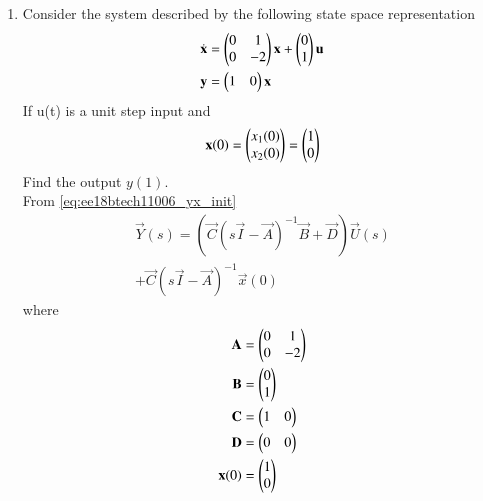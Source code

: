 \begin{enumerate}[label=\thesubsection.\arabic*.,ref=\thesubsection.\theenumi]

\item
Consider the system described by the following state space representation  
\begin{align}
\dot{\mathbf{ x}}&=\begin{pmatrix}0&1\\0&-2\end{pmatrix}\mathbf{x} + \begin{pmatrix}0\\1\end{pmatrix}\mathbf{u}\\  
\mathbf{y} &= \begin{pmatrix}1&0\end{pmatrix}\mathbf{x}
\end{align}
If u(t) is a unit step input and 
\begin{align}
\mathbf{x}(0)=\begin{pmatrix}x_{1}(0)\\x_{2}(0)\end{pmatrix}=\begin{pmatrix}1\\0\end{pmatrix}
\end{align}
Find the output $y(1)$.
\\
\solution From \ref{eq:ee18btech11006_yx_init}
%
%
\begin{multline}
\vec{Y}(s)=( \vec{C}{(s\vec{I}-\vec{A})^{-1}}\vec{B}+\vec{D}) \vec{U}(s) 
\\
+ \vec{C}(s\vec{I}-\vec{A})^{-1}\vec{x}(0)
\label{eq:ee18btech11006_yx_init}
\end{multline}
%
where
\begin{align}
\mathbf{A}&=\begin{pmatrix}0&1\\0&-2\end{pmatrix}\\
\mathbf{B}&=\begin{pmatrix}0\\1\end{pmatrix}\\
\mathbf{C}&=\begin{pmatrix}1&0\end{pmatrix}\\
\mathbf{D}&=\begin{pmatrix}0&0\end{pmatrix}\\
\mathbf{x}(0)&=\begin{pmatrix}1\\0\end{pmatrix}
\end{align}
%


\end{enumerate}
